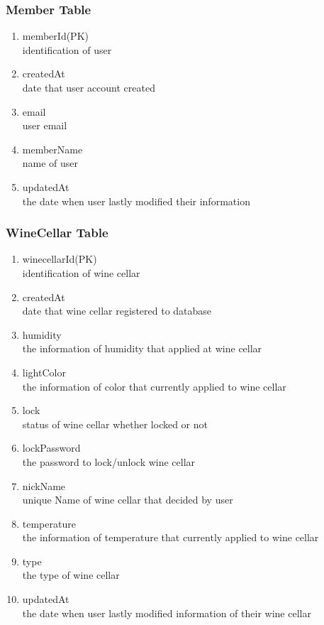 \documentclass[sigconf, nonacm]{acmart}
\begin{document}
\subsubsection{Member Table}
 \begin{enumerate}
        \item memberId(PK)\\
        identification of user
        \item createdAt\\
        date that user account created
        \item email\\
        user email
        \item memberName\\
        name of user
        \item updatedAt\\
        the date when user lastly modified their information
    \end{enumerate}

\subsubsection{WineCellar Table}
    \begin{enumerate}
        \item     winecellarId(PK)\\
        identification of wine cellar
        \item createdAt\\
        date that wine cellar registered to database
        \item humidity\\
        the information of humidity that applied at wine cellar
        \item lightColor\\
        the information of color that currently applied to wine cellar
        \item lock\\
        status of wine cellar whether locked or not
        \item lockPassword\\
        the password to lock/unlock wine cellar
        \item nickName\\
        unique Name of wine cellar that decided by user
        \item temperature\\
        the information of temperature that currently applied to wine cellar
        \item type\\
        the type of wine cellar
        \item updatedAt\\
        the date when user lastly modified information of their wine cellar
    \end{enumerate}
\end{document}
